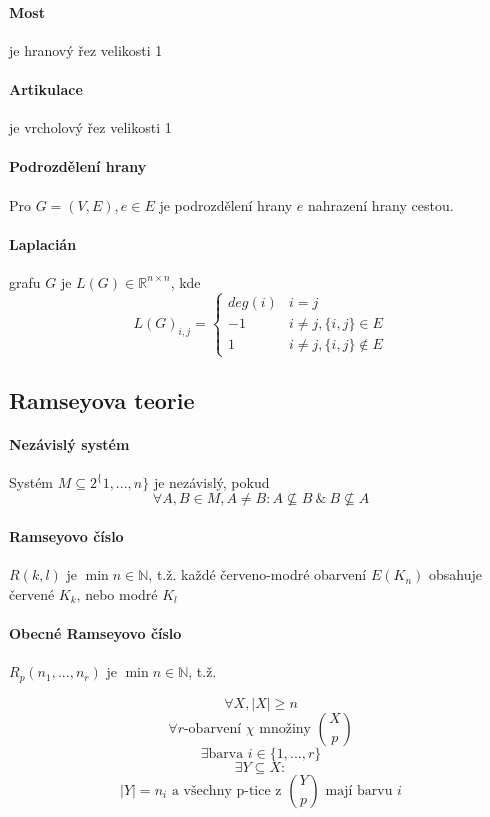\documentclass[10pt,a4paper]{article}
\theoremstyle{plain}
\begin{document}
\paragraph{Most} je hranový řez velikosti 1
\paragraph{Artikulace} je vrcholový řez velikosti 1
\paragraph{Podrozdělení hrany} Pro $G=(V,E), e \in E$ je podrozdělení hrany $e$ nahrazení hrany cestou.

\paragraph{Laplacián} grafu $G$ je $L(G) \in \mathbb{R}^{n \times n}$, kde 
\[ L(G)_{i,j} = \begin{cases}
deg(i) & i=j \\
-1		& i\neq j, \{i,j\} \in E \\
1		& i\neq j, \{i,j\} \notin E
\end{cases}\]

\subsection{Ramseyova teorie}

\paragraph{Nezávislý systém} Systém $M \subseteq 2^\{1,...,n\}$ je nezávislý, pokud
\[\forall A,B \in M, A \neq B: A \nsubseteq B\ \&\ B \nsubseteq A\]

\paragraph{Ramseyovo číslo} $R(k,l)$ je $\min n \in \mathbb{N}$, t.ž. každé červeno-modré obarvení $E(K_n)$ obsahuje červené $K_k$, nebo modré $K_l$

\paragraph{Obecné Ramseyovo číslo} $R_p(n_1, ..., n_r)$ je $\min n \in \mathbb{N}$, t.ž. 

\[\forall X, |X| \geq n\] 
\[\forall r\text{-obarvení } \chi \text{ množiny } \binom{X}{p}\]
\[\exists \text{barva } i \in \{1,...,r\}\]
\[\exists Y \subseteq X:\]
\[|Y| = n_i \text{ a všechny p-tice z } \binom{Y}{p} \text{ mají barvu } i\]
\end{document}
